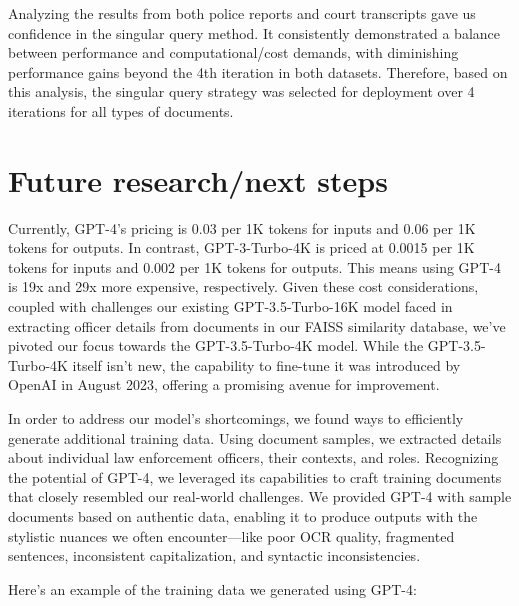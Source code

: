 \documentclass{article}
\begin{document}
Analyzing the results from both police reports and court transcripts gave us confidence in the singular query method. It consistently demonstrated a balance between performance and computational/cost demands, with diminishing performance gains beyond the 4th iteration in both datasets. Therefore, based on this analysis, the singular query strategy was selected for deployment over 4 iterations for all types of documents. 

\section{Future research/next steps}

Currently, GPT-4's pricing is 0.03 per 1K tokens for inputs and 0.06 per 1K tokens for outputs. In contrast, GPT-3-Turbo-4K is priced at 0.0015 per 1K tokens for inputs and 0.002 per 1K tokens for outputs. This means using GPT-4 is 19x and 29x more expensive, respectively. Given these cost considerations, coupled with challenges our existing GPT-3.5-Turbo-16K model faced in extracting officer details from documents in our FAISS similarity database, we've pivoted our focus towards the GPT-3.5-Turbo-4K model. While the GPT-3.5-Turbo-4K itself isn't new, the capability to fine-tune it was introduced by OpenAI in August 2023, offering a promising avenue for improvement.

In order to address our model's shortcomings, we found ways to efficiently generate additional training data. Using document samples, we extracted details about individual law enforcement officers, their contexts, and roles. Recognizing the potential of GPT-4, we leveraged its capabilities to craft training documents that closely resembled our real-world challenges. We provided GPT-4 with sample documents based on authentic data, enabling it to produce outputs with the stylistic nuances we often encounter---like poor OCR quality, fragmented sentences, inconsistent capitalization, and syntactic inconsistencies.

Here's an example of the training data we generated using GPT-4:
\end{document}
